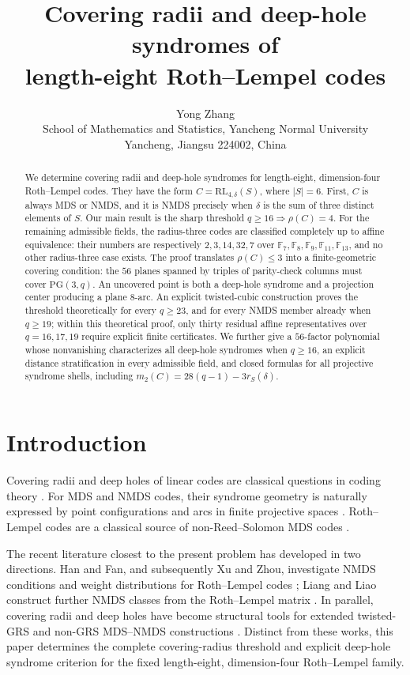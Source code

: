 \documentclass[11pt]{article}
\title{Covering radii and deep-hole syndromes of\\
length-eight Roth--Lempel codes}
\author{Yong Zhang\\
School of Mathematics and Statistics, Yancheng Normal University\\
Yancheng, Jiangsu 224002, China
}
\date{}
\newcommand{\F}{\mathbb F}
\newcommand{\PG}{\mathrm{PG}}
\newcommand{\RL}{\mathrm{RL}}
\theoremstyle{plain}
\theoremstyle{definition}
\begin{document}
\maketitle

\begin{abstract}
We determine covering radii and deep-hole syndromes for length-eight,
dimension-four Roth--Lempel codes.  They have the form
\(C=\RL_{4,\delta}(S)\), where \(|S|=6\).
First, \(C\) is always MDS or NMDS, and it is NMDS precisely when
\(\delta\) is the sum of three distinct elements of \(S\).  Our main result
is the sharp threshold \(q\ge16\Rightarrow \rho(C)=4\).
For the remaining admissible fields, the radius-three codes are classified
completely up to affine equivalence: their numbers are respectively
\(2,3,14,32,7\) over \(\F_7,\F_8,\F_9,\F_{11},\F_{13}\), and no other
radius-three case exists.  The proof translates \(\rho(C)\le3\) into a
finite-geometric covering condition: the \(56\) planes spanned by triples of
parity-check columns must cover \(\PG(3,q)\).  An uncovered point is both a
deep-hole syndrome and a projection center producing a plane \(8\)-arc.
An explicit twisted-cubic construction proves the threshold theoretically
for every \(q\ge23\), and for every NMDS member already when \(q\ge19\);
within this theoretical proof, only thirty residual affine representatives
over \(q=16,17,19\) require explicit finite certificates.  We further give
a \(56\)-factor polynomial whose
nonvanishing characterizes all deep-hole syndromes when \(q\ge16\), an
explicit distance stratification in every admissible field, and closed
formulas for all projective syndrome shells, including
\(m_2(C)=28(q-1)-3r_S(\delta)\).
\end{abstract}

\section{Introduction}

Covering radii and deep holes of linear codes are classical questions in
coding theory \cite{Cohen1997,Huffman2003,MWS1977}.  For MDS and NMDS codes,
their syndrome geometry is naturally expressed by point configurations and
arcs in finite projective spaces \cite{Ball2015,DodunekovLandgev1995}.
Roth--Lempel codes are a classical source of non-Reed--Solomon MDS codes
\cite{RothLempel1989}.

The recent literature closest to the present problem has developed in two
directions.  Han and Fan, and subsequently Xu and Zhou, investigate NMDS
conditions and weight distributions for Roth--Lempel codes
\cite{HanFan2023,XuZhou2026}; Liang and Liao construct further NMDS classes
from the Roth--Lempel matrix \cite{LiangLiao2026}.  In parallel, covering
radii and deep holes have become structural tools for extended twisted-GRS
and non-GRS MDS--NMDS constructions
\cite{LiZhuSun2025,LiLuLingLam2026}.  Distinct from these works, this paper
determines the complete covering-radius threshold and explicit deep-hole
syndrome criterion for the fixed length-eight, dimension-four
Roth--Lempel family.
\end{document}
